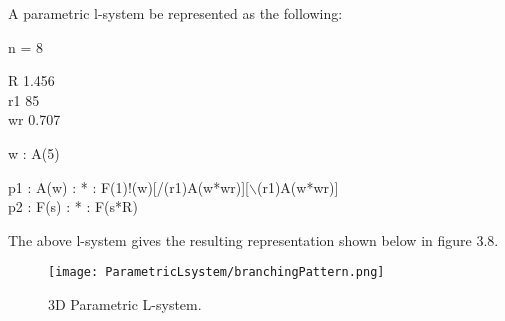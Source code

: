 \begin{flushleft}
\vspace{5mm}

A parametric l-system be represented as the following: \\

\vspace{5mm}

\hspace*{3cm} n = 8\\

\vspace{5mm}

\hspace*{3cm} R 1.456\\
\hspace*{3cm} r1 85\\
\hspace*{3cm} wr 0.707\\

\vspace{5mm}

\hspace*{3cm} w : A(5)\\

\vspace{5mm}

\hspace*{3cm} p1 : A(w) : * : F(1)!(w)[/(r1)A(w*wr)][$\backslash$(r1)A(w*wr)]\\
\hspace*{3cm} p2 : F(s) : * : F(s*R)\\

\vspace{5mm}

The above l-system gives the resulting representation shown below in figure 3.8. 

\begin{figure}[htbp]
	{\centering
		\vspace{7px}
		\texttt{[image: ParametricLsystem/branchingPattern.png]}
		\caption{3D Parametric L-system.}
	}
\end{figure}


\end{flushleft}

